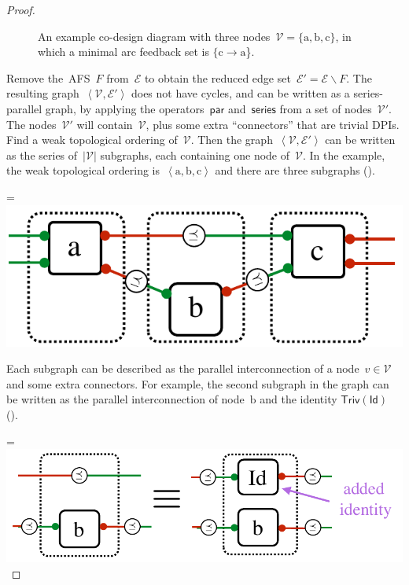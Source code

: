 \documentclass[twocolumn,english]{IEEEtran}
\theoremstyle{definition}
\theoremstyle{plain}
\theoremstyle{definition}
\theoremstyle{remark}
\theoremstyle{definition}
\theoremstyle{plain}
\theoremstyle{plain}
\newcommand{\idFunc}{\aword{Id}}
\newcommand{\aword}[1]{\mathsf{#1}}
\newcommand{\vmath}[1]{\aword{#1}}
\newcommand{\dpseries}{\vmath{series}}
\newcommand{\dppar}{\vmath{par}}
\newcommand{\cdpiN}{\mathcal{V}}
\newcommand{\cdpin}{v}
\newcommand*{\vcenteredhbox}[1]{\begingroup
\setbox0=\hbox{#1}\parbox{\wd0}{\box0}\endgroup}
\newcommand{\captionsideleft}[2]{
    \medskip
    \begin{minipage}{1.8cm}{
        \hfill
        \protect\captionof{figure}{#1}}\end{minipage}
    \begin{minipage}{6.6cm}
    
    \vcenteredhbox{{#2}}
    \hfill
    \end{minipage}
    \medskip
}
\newcommand{\triv}{\mathsf{Triv}}
\begin{document}
\begin{proof}
\begin{figure}[H]
{\begin{centering}
\par\end{centering}

}

\caption{An example co-design diagram with three nodes~$\cdpiN=\{\text{a},\text{b},\text{c}\}$,
in which a minimal arc feedback set is $\{\text{c}\rightarrow\text{a}$\}.}
\end{figure}

Remove the~AFS~$F$ from~$\mathcal{E}$ to obtain the reduced edge
set~$\mathcal{E}'=\mathcal{E}\backslash F$.  The resulting graph~$\left\langle \cdpiN,\mathcal{E}'\right\rangle $
does not have cycles, and can be written as a series-parallel graph,
by applying the operators~$\dppar$ and~$\dpseries$ from a set
of nodes~$\cdpiN'$. The nodes~$\cdpiN'$ will contain~$\cdpiN$,
plus some extra ``connectors'' that are trivial DPIs. Find a weak
topological ordering of~$\cdpiN$. Then the graph~$\left\langle \cdpiN,\mathcal{E}'\right\rangle $
can be written as the series of~$|\cdpiN|$ subgraphs, each containing
one node of~$\cdpiN$. In the example, the weak topological ordering
is~$\left\langle \text{a},\text{b},\text{c}\right\rangle $ and there
are three subgraphs (). 

\captionsideleft{\label{fig:cdpi_comp3}}{\includegraphics[scale=0.33]{gmcdptro_cdpi_comp3}}

\noindent Each subgraph can be described as the parallel interconnection
of a node~$\cdpin\in\cdpiN$ and some extra connectors. For example,
the second subgraph in the graph can be written as the parallel interconnection
of node~$\text{b}$ and the identity $\triv(\idFunc)$ ().

\captionsideleft{\label{fig:cdpi_comp4}}{\includegraphics[scale=0.33]{gmcdptro_cdpi_comp4}}


\end{proof}
\end{document}
